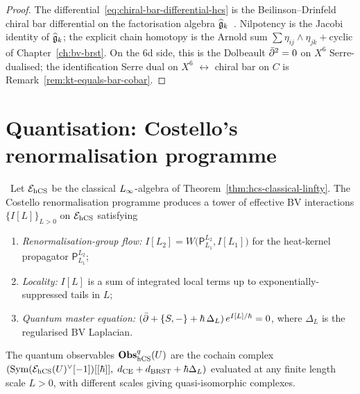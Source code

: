 \begin{proof}
The differential~\eqref{eq:chiral-bar-differential-hcs} is the
Beilinson--Drinfeld chiral bar differential on the factorisation
algebra $\widehat{\mathfrak{g}}_k$~\cite{BD04}. Nilpotency is the Jacobi identity
of $\widehat{\mathfrak{g}}_k$; the explicit chain homotopy is the Arnold sum
$\sum \eta_{ij}\wedge\eta_{jk}+\text{cyclic}$ of
Chapter~\ref{ch:bv-brst}. On the 6d side,
this is the Dolbeault $\bar\partial^2 = 0$ on $X^6$ Serre-dualised; the
identification Serre dual on $X^6$ $\longleftrightarrow$ chiral bar
on $C$ is Remark~\ref{rem:kt-equals-bar-cobar}.
\end{proof}

\section{Quantisation: Costello's renormalisation programme}
\label{sec:hcs-quantisation}

\begin{theorem}
\label{thm:hcs-QME-one-loop}
%
\ClaimStatusProvedElsewhere\,\cite{CostelloRenormalization,CostelloGwilliam2021}
Let $\mathcal{E}_{\mathrm{hCS}}$ be the classical $L_\infty$-algebra of
Theorem~\ref{thm:hcs-classical-linfty}. The Costello
renormalisation programme produces a tower of effective
BV interactions $\{I[L]\}_{L>0}$ on $\mathcal{E}_{\mathrm{hCS}}$ satisfying
\begin{enumerate}[label=\textup{(\roman*)}]
 \item \emph{Renormalisation-group flow:}
 $I[L_2] = W\bigl(\mathsf{P}_{L_1}^{L_2},I[L_1]\bigr)$ for the heat-kernel
 propagator $\mathsf{P}_{L_1}^{L_2}$;
 \item \emph{Locality:} $I[L]$ is a sum of integrated local terms
 up to exponentially-suppressed tails in $L$;
 \item \emph{Quantum master equation:}
 $(\bar\partial+\{S,-\}+\hbar\,\Delta_L)\,e^{I[L]/\hbar}=0$, where
 $\Delta_L$ is the regularised BV Laplacian.
\end{enumerate}
The quantum observables $\mathbf{Obs}^{q}_{\mathrm{hCS}}(U)$ are the cochain complex
$(\mathrm{Sym}(\mathcal{E}_{\mathrm{hCS}}(U)^\vee[-1])[[\hbar]],\;d_{\mathrm{CE}}+d_{\mathrm{BRST}}
+\hbar\Delta_L)$ evaluated at any
finite length scale $L > 0$, with different scales giving
quasi-isomorphic complexes.
\end{theorem}

